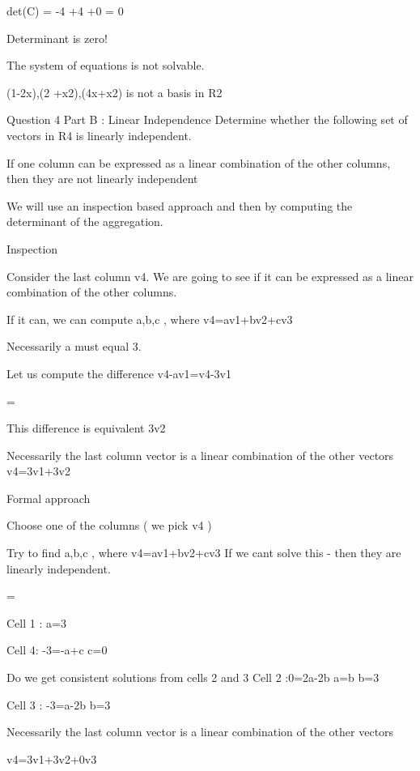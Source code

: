  
det(C) = -4 +4 +0 = 0
 
 
Determinant is zero!
 
The system of equations is not solvable.
 
{(1-2x),(2 +x2),(4x+x2)} is not a basis in R2
 
 
 
Question 4 Part B : Linear Independence
Determine whether the following set of vectors in R4 is linearly independent.
 
     
 
If one column can be expressed as a linear combination of the other columns, then they are not linearly independent
 
We will use an inspection based approach and then by computing the determinant of the aggregation.
 
 
Inspection 
 
Consider the last column v4. We are going to see if it can be expressed as a linear combination of the other columns.
 
If it can, we can compute {a,b,c }, where v4=av1+bv2+cv3
 
Necessarily a must equal 3.
 
Let us compute the difference v4-av1=v4-3v1
 
      = 
 
This difference is equivalent 3v2
 
 
Necessarily the last column vector is a linear combination of the other vectors v4=3v1+3v2 
 
Formal approach
 
Choose one of the columns ( we pick v4 )
 
Try to find {a,b,c }, where v4=av1+bv2+cv3
If we cant solve this - then they are linearly independent.
 
 
      = 
 
Cell 1 : a=3
 
Cell 4: -3=-a+c	c=0
 
Do we get consistent solutions from cells 2 and 3
Cell 2 :0=2a-2b	a=b	b=3
 
Cell 3 : -3=a-2b  b=3  
 
 
Necessarily the last column vector is a linear combination of the other vectors 
 
v4=3v1+3v2+0v3 
 
 
 
 
  
 
 
 

